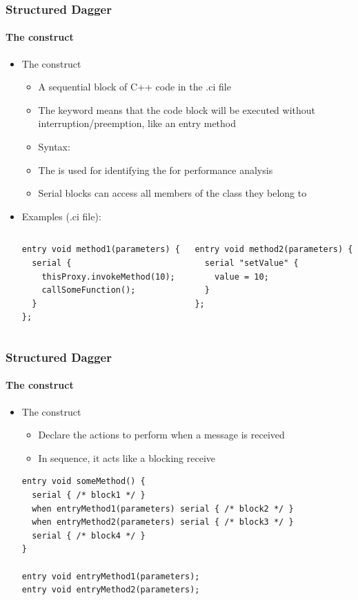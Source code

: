 \begin{frame}[fragile]
  \frametitle{Structured Dagger}
  \framesubtitle{The  construct}
  \begin{itemize}
    \item The  construct
      \begin{itemize}
        \item A sequential block of C++ code in the .ci file
        \item The keyword  means that the code block will be
          executed without interruption/preemption, like an entry method
        \item Syntax: 
        \item The  is used for identifying the
           for performance analysis
        \item Serial blocks can access all members of the class they belong to
      \end{itemize}
    \item Examples (.ci file):
  \begin{columns}
    \begin{column}{0.5\textwidth}
      \begin{lstlisting}[basicstyle=\tiny]
entry void method1(parameters) {
  serial {
    thisProxy.invokeMethod(10);
    callSomeFunction();
  }
};
      \end{lstlisting}
    \end{column}
    \begin{column}{0.5\textwidth}
      \begin{lstlisting}[basicstyle=\tiny]
entry void method2(parameters) {
  serial "setValue" {
    value = 10;
  }
};
      \end{lstlisting}
    \end{column}
  \end{columns}
  \end{itemize}
\end{frame}

\begin{frame}[fragile]
  \frametitle{Structured Dagger}
  \framesubtitle{The  construct}
  \begin{itemize}
    \item The  construct
      \begin{itemize}
        \item Declare the actions to perform when a message is received
        \item In sequence, it acts like a blocking receive
      \end{itemize}
      \begin{lstlisting}[basicstyle=\normalsize]
entry void someMethod() {
  serial { /* block1 */ }
  when entryMethod1(parameters) serial { /* block2 */ }
  when entryMethod2(parameters) serial { /* block3 */ }
  serial { /* block4 */ }
}

entry void entryMethod1(parameters);
entry void entryMethod2(parameters);
      \end{lstlisting}
    \end{itemize}
\end{frame}

